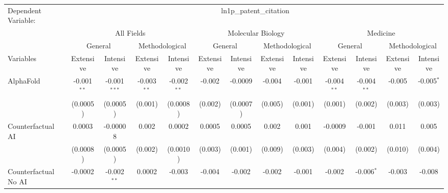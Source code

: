 \begingroup
\centering
\begin{tabular}{lcccccccccccc}
   \tabularnewline \midrule \midrule
   Dependent Variable: & \multicolumn{12}{c}{ln1p\_patent\_citation}\\
 & \multicolumn{4}{c}{All Fields} & \multicolumn{4}{c}{Molecular Biology} & \multicolumn{4}{c}{Medicine} \\
\cmidrule(lr){2-5} \cmidrule(lr){6-9} \cmidrule(lr){10-13}
 & \multicolumn{2}{c}{General} & \multicolumn{2}{c}{Methodological} & \multicolumn{2}{c}{General} & \multicolumn{2}{c}{Methodological} & \multicolumn{2}{c}{General} & \multicolumn{2}{c}{Methodological} \\
\cmidrule(lr){2-3} \cmidrule(lr){4-5} \cmidrule(lr){6-7} \cmidrule(lr){8-9} \cmidrule(lr){10-11} \cmidrule(lr){12-13}
Variables & \multicolumn{1}{c}{Extensive} & \multicolumn{1}{c}{Intensive} & \multicolumn{1}{c}{Extensive} & \multicolumn{1}{c}{Intensive} & \multicolumn{1}{c}{Extensive} & \multicolumn{1}{c}{Intensive} & \multicolumn{1}{c}{Extensive} & \multicolumn{1}{c}{Intensive} & \multicolumn{1}{c}{Extensive} & \multicolumn{1}{c}{Intensive} & \multicolumn{1}{c}{Extensive} & \multicolumn{1}{c}{Intensive} \\
\cmidrule(lr){1-1}\cmidrule(lr){2-2} \cmidrule(lr){3-3} \cmidrule(lr){4-4} \cmidrule(lr){5-5} \cmidrule(lr){6-6} \cmidrule(lr){7-7} \cmidrule(lr){8-8} \cmidrule(lr){9-9} \cmidrule(lr){10-10} \cmidrule(lr){11-11} \cmidrule(lr){12-12} \cmidrule(lr){13-13}
   AlphaFold                                & -0.001$^{**}$ & -0.001$^{***}$ & -0.003$^{**}$ & -0.002$^{**}$ & -0.002  & -0.0009  & -0.004  & -0.001   & -0.004$^{**}$ & -0.004$^{**}$ & -0.005  & -0.005$^{*}$\\   
                                            & (0.0005)      & (0.0005)       & (0.001)       & (0.0008)      & (0.002) & (0.0007) & (0.005) & (0.001)  & (0.001)       & (0.002)       & (0.003) & (0.003)\\   
   Counterfactual AI                        & 0.0003        & -0.00008       & 0.002         & 0.0002        & 0.0005  & 0.0005   & 0.002   & 0.001    & -0.0009       & -0.001        & 0.011   & 0.005\\   
                                            & (0.0008)      & (0.0005)       & (0.002)       & (0.0010)      & (0.003) & (0.001)  & (0.009) & (0.003)  & (0.004)       & (0.002)       & (0.010) & (0.004)\\   
   Counterfactual No AI                     & -0.0002       & -0.002$^{**}$  & 0.0002        & -0.003        & -0.004  & -0.002   & -0.002  & -0.001   & -0.002        & -0.006$^{*}$  & -0.003  & -0.008\\   

\end{tabular}
